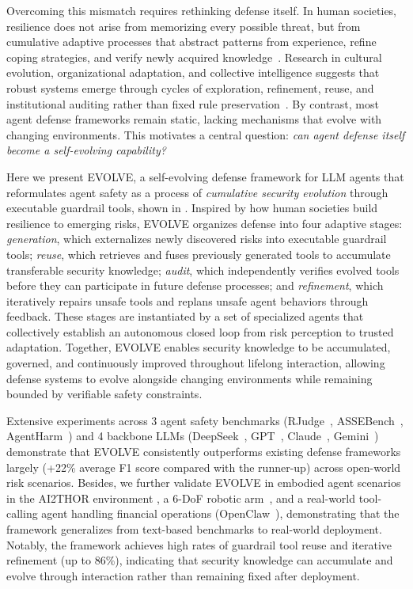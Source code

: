 Overcoming this mismatch requires rethinking defense itself. In human societies, resilience does not arise from memorizing every possible threat, but from cumulative adaptive processes that abstract patterns from experience, refine coping strategies, and verify newly acquired knowledge~\citep{boyd1988culture,henrich2015secret,weick2011managing,taleb2012things}. Research in cultural evolution, organizational adaptation, and collective intelligence suggests that robust systems emerge through cycles of exploration, refinement, reuse, and institutional auditing rather than fixed rule preservation~\cite{argyris1997organizational}. By contrast, most agent defense frameworks remain static, lacking mechanisms that evolve with changing environments. This motivates a central question: \emph{can agent defense itself become a self-evolving capability?}


Here we present EVOLVE, a self-evolving defense framework for LLM agents that reformulates agent safety as a process of \emph{cumulative security evolution} through executable guardrail tools, shown in . Inspired by how human societies build resilience to emerging risks, EVOLVE organizes defense into four adaptive stages: \emph{generation}, which externalizes newly discovered risks into executable guardrail tools; \emph{reuse}, which retrieves and fuses previously generated tools to accumulate transferable security knowledge; \emph{audit}, which independently verifies evolved tools before they can participate in future defense processes; and \emph{refinement}, which iteratively repairs unsafe tools and replans unsafe agent behaviors through feedback. These stages are instantiated by a set of specialized agents that collectively establish an autonomous closed loop from risk perception to trusted adaptation. Together, EVOLVE enables security knowledge to be accumulated, governed, and continuously improved throughout lifelong interaction, allowing defense systems to evolve alongside changing environments while remaining bounded by verifiable safety constraints.

Extensive experiments across 3 agent safety benchmarks (RJudge~\cite{yuan2024rjudge}, ASSEBench~\cite{luo2025agentauditor}, AgentHarm~\cite{andriushchenko2025agentharm}) and 4 backbone LLMs (DeepSeek~\cite{liu2024deepseek}, GPT~\cite{achiam2023gpt}, Claude~\cite{bai2022constitutional}, Gemini~\cite{team2023gemini}) demonstrate that EVOLVE consistently outperforms existing defense frameworks largely (+22\% average F1 score compared with the runner-up) across open-world risk scenarios. Besides, we further validate EVOLVE in embodied agent scenarios in the AI2THOR environment \cite{kolve2022ai2thor}, a 6-DoF robotic arm~\cite{elephant}, and a real-world tool-calling agent handling financial operations (OpenClaw~\cite{openclaw}), demonstrating that the framework generalizes from text-based benchmarks to real-world deployment. Notably, the framework achieves high rates of guardrail tool reuse and iterative refinement (up to 86\%), indicating that security knowledge can accumulate and evolve through interaction rather than remaining fixed after deployment.


